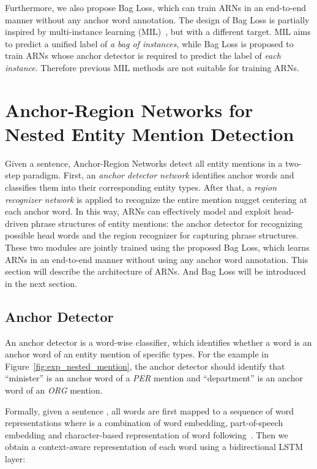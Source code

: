 \documentclass[11pt,a4paper]{article}
\begin{document}
Furthermore, we also propose Bag Loss, which can train ARNs in an end-to-end manner without any anchor word annotation. The design of Bag Loss is partially inspired by multi-instance learning (MIL)~\cite{zhou2007multi,zhou2009multi,surdeanu2012multi}, but with a different target. MIL aims to predict a unified label of \emph{a bag of instances}, while Bag Loss is proposed to train ARNs whose anchor detector is required to predict the label of \emph{each instance}. Therefore previous MIL methods are not suitable for training ARNs.


\section{Anchor-Region Networks for Nested Entity Mention Detection}
Given a sentence, Anchor-Region Networks detect all entity mentions in a two-step paradigm. First, an \emph{anchor detector network} identifies anchor words and classifies them into their corresponding entity types. After that, a \emph{region recognizer network} is applied to recognize the entire mention nugget centering at each anchor word. In this way, ARNs can effectively model and exploit head-driven phrase structures of entity mentions: the anchor detector for recognizing possible head words and the region recognizer for capturing phrase structures. These two modules are jointly trained using the proposed Bag Loss, which learns ARNs in an end-to-end manner without using any anchor word annotation. This section will describe the architecture of ARNs. And Bag Loss will be introduced in the next section.

\subsection{Anchor Detector}
An anchor detector is a word-wise classifier, which identifies whether a word is an anchor word of an entity mention of specific types. For the example in Figure~\ref{fig:exp_nested_mention}, the anchor detector should identify that ``minister'' is an anchor word of a \emph{PER} mention and ``department'' is an anchor word of an \emph{ORG} mention.

Formally, given a sentence , all words are first mapped to a sequence of word representations  where  is a combination of word embedding, part-of-speech embedding and character-based representation of word  following~\citet{lample2016neural}. Then we obtain a context-aware representation  of each word  using a bidirectional LSTM layer:
\end{document}
